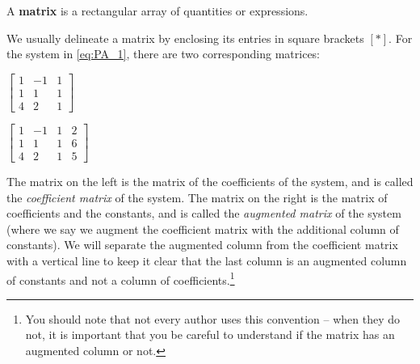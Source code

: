 \begin{definition} A \textbf{matrix} is a rectangular array of quantities or expressions.
\end{definition}



We usually delineate a matrix by enclosing its entries in square brackets $[ * ]$. For the system in \eqref{eq:PA_1}, there are two corresponding matrices: 
\begin{center}
\begin{minipage}{2.0in}
\begin{center}
$\left[ \begin{array}{rrr} 1 	&-1 	&1 	\\ 1	&1		&1	\\ 4	&2		&1 \end{array} \right]$ 
\end{center}
\end{minipage}
\begin{minipage}{2.0in}
\begin{center}
$\left[ \begin{array}{rrr|r} 1 	&-1 	&1 &2 	\\ 1	&1		&1 &6	 \\ 4	 &2		&1 &5 \end{array} \right]$
\end{center}
\end{minipage}
\end{center}
The matrix on the left is the matrix of the coefficients of the system, and is called the \emph{coefficient matrix} of the system. The matrix on the right is the matrix of coefficients and the constants, and is called the \emph{augmented matrix} of the system (where we say we augment the coefficient matrix with the additional column of constants). We will separate the augmented column from the coefficient matrix with a vertical line to keep it clear that the last column is an augmented column of constants and not a column of coefficients.\footnote{You should note that not every author uses this convention -- when they do not, it is important that you be careful to understand if the matrix has an augmented column or not.}


